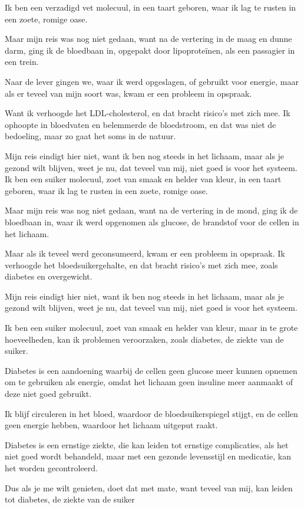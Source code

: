 Ik ben een verzadigd vet molecuul,
in een taart geboren,
waar ik lag te rusten
in een zoete, romige oase.

Maar mijn reis was nog niet gedaan,
want na de vertering in de maag en dunne darm,
ging ik de bloedbaan in,
opgepakt door lipoproteïnen,
als een passagier in een trein.

Naar de lever gingen we,
waar ik werd opgeslagen,
of gebruikt voor energie,
maar als er teveel van mijn soort was,
kwam er een probleem in opspraak.

Want ik verhoogde het LDL-cholesterol,
en dat bracht risico's met zich mee.
Ik ophoopte in bloedvaten
en belemmerde de bloedstroom,
en dat was niet de bedoeling,
maar zo gaat het soms in de natuur.

Mijn reis eindigt hier niet,
want ik ben nog steeds in het lichaam,
maar als je gezond wilt blijven,
weet je nu, dat teveel van mij,
niet goed is voor het systeem.
Ik ben een suiker molecuul,
zoet van smaak en helder van kleur,
in een taart geboren,
waar ik lag te rusten
in een zoete, romige oase.

Maar mijn reis was nog niet gedaan,
want na de vertering in de mond,
ging ik de bloedbaan in,
waar ik werd opgenomen als glucose,
de brandstof voor de cellen in het lichaam.

Maar als ik teveel werd geconsumeerd,
kwam er een probleem in opspraak.
Ik verhoogde het bloedsuikergehalte,
en dat bracht risico's met zich mee,
zoals diabetes en overgewicht.

Mijn reis eindigt hier niet,
want ik ben nog steeds in het lichaam,
maar als je gezond wilt blijven,
weet je nu, dat teveel van mij,
niet goed is voor het systeem.

Ik ben een suiker molecuul,
zoet van smaak en helder van kleur,
maar in te grote hoeveelheden,
kan ik problemen veroorzaken,
zoals diabetes, de ziekte van de suiker.

Diabetes is een aandoening waarbij
de cellen geen glucose meer kunnen opnemen
om te gebruiken als energie,
omdat het lichaam geen insuline meer aanmaakt of deze niet goed gebruikt.

Ik blijf circuleren in het bloed,
waardoor de bloedsuikerspiegel stijgt,
en de cellen geen energie hebben,
waardoor het lichaam uitgeput raakt.

Diabetes is een ernstige ziekte,
die kan leiden tot ernstige complicaties,
als het niet goed wordt behandeld,
maar met een gezonde levensstijl en medicatie,
kan het worden gecontroleerd.

Dus als je me wilt genieten,
doet dat met mate,
want teveel van mij,
kan leiden tot diabetes,
de ziekte van de suiker
